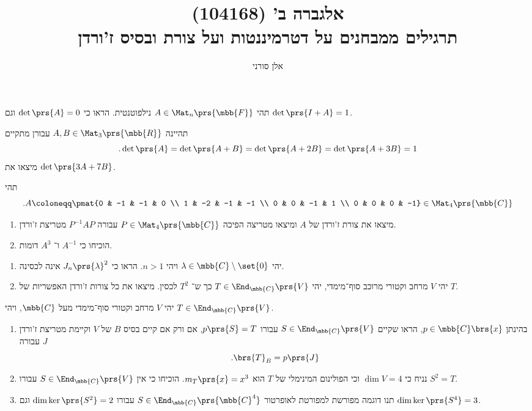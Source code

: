 \documentclass[a4paper,10pt,twoside,openany]{article}
\title{
אלגברה ב' (104168)  \\
תרגילים ממבחנים על דטרמיננטות ועל צורת ובסיס ז'ורדן
}
\author{אלן סורני}
\begin{document}
\maketitle

\begin{exercise}
תהי
$A \in \Mat_n\prs{\mbb{F}}$
נילפוטנטית. הראו כי
$\det\prs{A} = 0$
וגם
$\det\prs{I+A} = 1$.
\end{exercise}

\begin{exercise}
תהיינה
$A,B \in \Mat_{3}\prs{\mbb{R}}$
עבורן מתקיים
\[\text{.} \det\prs{A} = \det\prs{A+B} = \det\prs{A + 2B} = \det\prs{A + 3B} = 1\]
מיצאו את
$\det\prs{3A + 7B}$.
\end{exercise}

\begin{exercise}
תהי
\[\text{.} A \coloneqq \pmat{0 & -1 & -1 & 0 \\ 1 & -2 & -1 & -1 \\ 0 & 0 & -1 & 1 \\ 0 & 0 & 0 & -1} \in \Mat_4\prs{\mbb{C}}\]
\begin{enumerate}
\item מיצאו את צורת ז'ורדן של
$A$
ומיצאו מטריצה הפיכה
$P \in \Mat_4\prs{\mbb{C}}$
עבורה
$P^{-1} A P$
מטריצת ז'ורדן.

\item הוכיחו כי
$A^{-1}$
ו־%
$A^3$
דומות.
\end{enumerate}
\end{exercise}

\begin{exercise}
\begin{enumerate}
\item
יהי
$\lambda \in \mbb{C} \setminus \set{0}$
ויהי
$n > 1$.
הראו כי
$J_n\prs{\lambda}^2$
אינה לכסינה.

\item
יהי
$V$
מרחב וקטורי מרוכב סוף־מימדי, יהי
$T \in \End_{\mbb{C}}\prs{V}$
כך ש־%
$T^2$
לכסין. מיצאו את כל צורות ז'ורדן האפשריות של
$T$.
\end{enumerate}
\end{exercise}

\begin{exercise}
יהי
$V$
מרחב וקטורי סוף־מימדי מעל
$\mbb{C}$,
ויהי
$T \in \End_{\mbb{C}}\prs{V}$.
\begin{enumerate}
\item בהינתן
$p \in \mbb{C}\brs{x}$,
הראו שקיים
$S \in \End_{\mbb{C}}\prs{V}$
עבורו
$p\prs{S} = T$,
אם ורק אם קיים בסיס
$B$
של
$V$
וקיימת מטריצת ז'ורדן
$J$
עבורה
\[\text{.} \brs{T}_B = p\prs{J}\]

\item
נניח כי
$\dim V = 4$
וכי הפולינום המינימלי של
$T$
הוא
$m_T\prs{x} = x^3$.
הוכיחו כי אין
$S \in \End_{\mbb{C}}\prs{V}$
עבורו
$S^2 = T$.
\item
תנו דוגמה מפורשת למפורטת לאופרטור
$S \in \End_{\mbb{C}}\prs{\mbb{C}^4}$
עבורו
$\dim \ker \prs{S^2} = 2$
וגם
$\dim \ker \prs{S^4} = 3$.
\end{enumerate}
\end{exercise}
\end{document}
